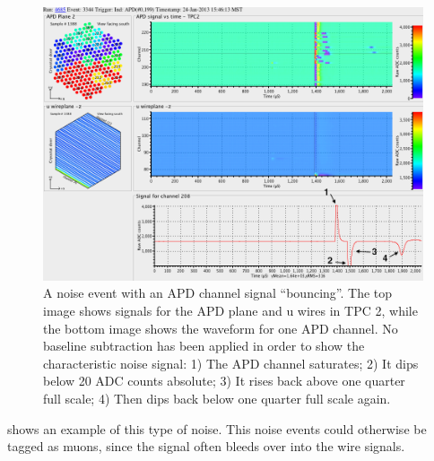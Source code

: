 \documentclass[herrin-thesis.tex]{subfiles}
\begin{document}
\begin{figure}[tbp]
\centering
\includegraphics[width=\textwidth]{./plots/noise_eventdisplay_run_4685_ev_3344_annotated.png}
\caption[APD ``bouncing'' noise]{A noise event with an APD channel signal ``bouncing''. The top image shows signals for the APD plane and u wires in TPC 2, while the bottom image shows the waveform for one APD channel. No baseline subtraction has been applied in order to show the characteristic noise signal: 1) The APD channel saturates; 2) It dips below 20 ADC counts absolute; 3) It rises back above one quarter full scale; 4) Then dips back below one quarter full scale again.}
\label{fig:noise_apd_bounce}
\end{figure}

 shows an example of this type of noise. This noise events could otherwise be tagged as muons, since the signal often bleeds over into the wire signals.
\end{document}
